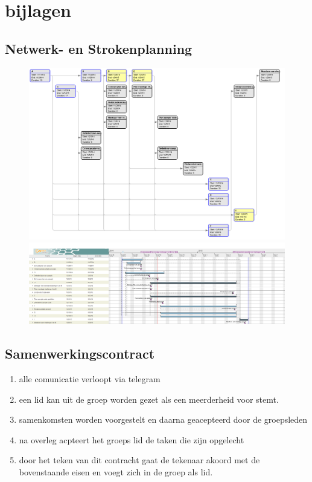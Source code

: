 \documentclass[oneside]{book}
\begin{document}
\clearpage
\part*{bijlagen}
\chapter*{Netwerk- en Strokenplanning}
\begin{figure}[H]\begin{adjustwidth}{-3cm}{}
\includegraphics[scale=0.35]{image/netwerkplanning.png}
\includegraphics[scale=0.25]{image/strokenplanning.png}
\end{adjustwidth}\end{figure}
\chapter*{Samenwerkingscontract}
\begin{enumerate}
	\item alle comunicatie verloopt via telegram
	\item een lid kan uit de groep worden gezet als een meerderheid voor stemt.
	\item samenkomsten worden voorgestelt en daarna geacepteerd door de groepsleden
	\item na overleg acpteert het groeps lid de taken die zijn opgelecht
	\item door het teken van dit contracht gaat de tekenaar akoord met de bovenstaande eisen en voegt zich in de groep als lid.
\end{enumerate}
\end{document}
